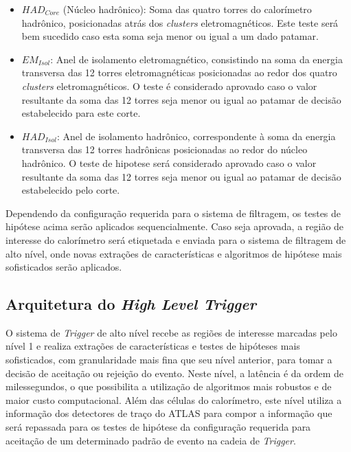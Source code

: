 \begin{itemize}

\item $HAD_{Core}$ (Núcleo hadrônico): Soma das quatro torres do calorímetro hadrônico, posicionadas atrás dos \textit{clusters} eletromagnéticos.  Este teste será bem sucedido
caso esta soma seja menor ou igual a um dado patamar.

\item $EM_{Isol}$: Anel de isolamento eletromagnético, consistindo na soma da energia transversa das 12 torres eletromagnéticas posicionadas ao redor dos quatro 
\textit{clusters} eletromagnéticos. O teste é considerado aprovado caso o valor resultante da soma das 12 torres seja menor ou igual ao patamar de decisão estabelecido
para este corte.

\item $HAD_{Isol}$: Anel de isolamento hadrônico, correspondente à soma da energia transversa das 12 torres hadrônicas posicionadas ao redor do núcleo hadrônico.
O teste de hipotese será considerado aprovado caso o valor resultante da soma das 12 torres seja menor ou igual ao patamar de decisão estabelecido pelo corte.  

\end{itemize}

Dependendo da configuração requerida para o sistema de filtragem, os testes de hipótese acima serão aplicados sequencialmente. Caso seja aprovada,  a região de interesse do calorímetro será etiquetada e enviada para o sistema de filtragem de alto nível, onde novas extrações de características e algoritmos de hipótese mais sofisticados serão aplicados.

\subsection{Arquitetura do \textit{High Level Trigger}}

O sistema de \textit{Trigger} de alto nível recebe as regiões de interesse marcadas pelo nível 1 e realiza extrações de características e testes de hipóteses mais sofisticados, com granularidade
mais fina que seu nível anterior, para tomar a decisão de aceitação ou rejeição do evento. Neste nível, a latência é da ordem de milessegundos, o que possibilita a utilização de algoritmos mais
robustos e de maior custo computacional. Além das células do calorímetro, este nível utiliza a informação dos detectores de traço do ATLAS para compor a informação que será repassada para os testes de hipótese da configuração requerida para aceitação de um determinado padrão de evento na cadeia de \textit{Trigger}.

